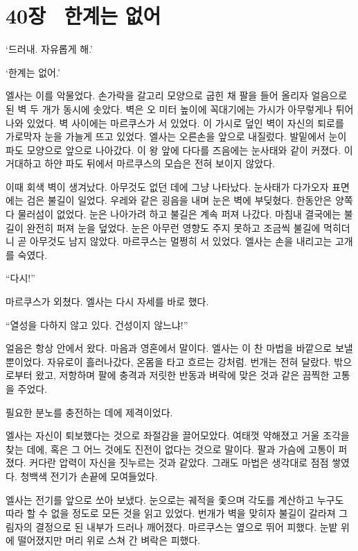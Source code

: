 

\chapter[40장  한계는 없어][40장\hspace*{.5em}한계는 없어]{40장 \ 한계는 없어}



\forceindent`드러내. 자유롭게 해.'

`한계는 없어.'

엘사는 이를 악물었다. 손가락을 갈고리 모양으로 굽힌 채 팔을 들어 올리자 얼음으로 된 벽 두 개가 동시에 솟았다. 벽은 오 미터 높이에 꼭대기에는 가시가 아무렇게나 튀어나와 있었다. 벽 사이에는 마르쿠스가 서 있었다. 이 가시로 덮인 벽이 자신의 퇴로를 가로막자 눈을 가늘게 뜨고 있었다. 엘사는 오른손을 앞으로 내질렀다. 발밑에서 눈이 파도 모양으로 앞으로 나아갔다. 이 왕 앞에 다다를 즈음에는 눈사태와 같이 커졌다. 이 거대하고 하얀 파도 뒤에서 마르쿠스의 모습은 전혀 보이지 않았다.

이때 회색 벽이 생겨났다. 아무것도 없던 데에 그냥 나타났다. 눈사태가 다가오자 표면에는 검은 불길이 일었다. 우레와 같은 굉음을 내며 눈은 벽에 부딪혔다. 한동안은 양쪽 다 물러섬이 없었다. 눈은 나아가려 하고 불길은 계속 퍼져 나갔다. 마침내 결국에는 불길이 완전히 퍼져 눈을 덮었다. 눈은 아무런 영향도 주지 못하고 조금씩 불길에 먹히더니 곧 아무것도 남지 않았다. 마르쿠스는 멀쩡히 서 있었다. 엘사는 손을 내리고는 고개를 숙였다.

``다시!''

마르쿠스가 외쳤다. 엘사는 다시 자세를 바로 했다.

``열성을 다하지 않고 있다. 건성이지 않느냐!''

얼음은 항상 안에서 왔다. 마음과 영혼에서 말이다. 엘사는 이 찬 마법을 바깥으로 보낼 뿐이었다. 자유로이 흘러나갔다, 온몸을 타고 흐르는 강처럼. 번개는 전혀 달랐다. 밖으로부터 왔고, 저항하며 팔에 충격과 저릿한 반동과 벼락에 맞은 것과 같은 끔찍한 고통을 주었다.

필요한 분노를 충전하는 데에 제격이었다.

엘사는 자신이 퇴보했다는 것으로 좌절감을 끌어모았다. 여태껏 약해졌고 거울 조각을 찾는 데에, 혹은 그 어느 것에도 진전이 없다는 것으로 말이다. 팔과 가슴에 고통이 퍼졌다. 커다란 압력이 자신을 짓누르는 것과 같았다. 그래도 마법은 생각대로 점점 쌓였다. 청백색 전기가 손끝에 모여들었다.

엘사는 전기를 앞으로 쏘아 보냈다. 눈으로는 궤적을 좇으며 각도를 계산하고 누구도 따라 할 수 없을 정도로 모든 것을 읽고 있었다. 번개가 벽을 맞히자 불길이 갈라져 그림자의 결정으로 된 내부가 드러나 깨어졌다. 마르쿠스는 옆으로 뛰어 피했다. 눈밭 위에 떨어졌지만 머리 위로 스쳐 간 벼락은 피했다.

